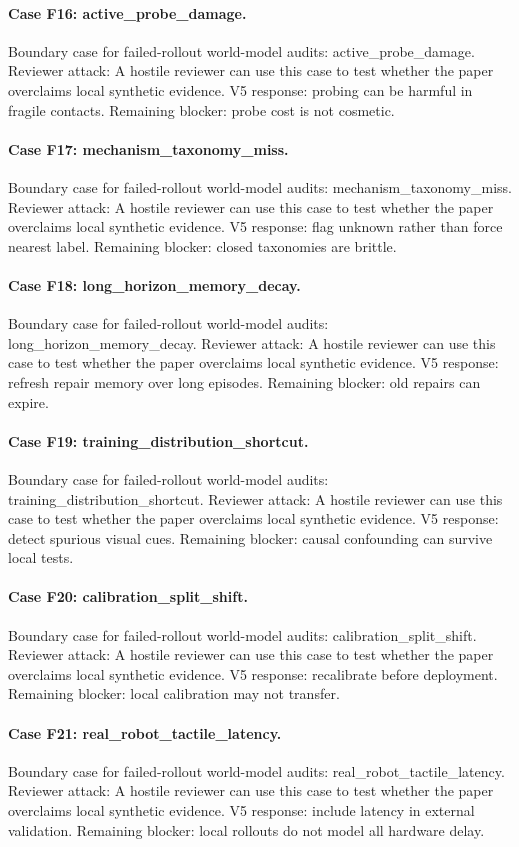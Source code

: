 \documentclass{article}
\begin{document}
\paragraph{Case F16: active\_probe\_damage.} Boundary case for failed-rollout world-model audits: active\_probe\_damage. Reviewer attack: A hostile reviewer can use this case to test whether the paper overclaims local synthetic evidence. V5 response: probing can be harmful in fragile contacts. Remaining blocker: probe cost is not cosmetic.
\paragraph{Case F17: mechanism\_taxonomy\_miss.} Boundary case for failed-rollout world-model audits: mechanism\_taxonomy\_miss. Reviewer attack: A hostile reviewer can use this case to test whether the paper overclaims local synthetic evidence. V5 response: flag unknown rather than force nearest label. Remaining blocker: closed taxonomies are brittle.
\paragraph{Case F18: long\_horizon\_memory\_decay.} Boundary case for failed-rollout world-model audits: long\_horizon\_memory\_decay. Reviewer attack: A hostile reviewer can use this case to test whether the paper overclaims local synthetic evidence. V5 response: refresh repair memory over long episodes. Remaining blocker: old repairs can expire.
\paragraph{Case F19: training\_distribution\_shortcut.} Boundary case for failed-rollout world-model audits: training\_distribution\_shortcut. Reviewer attack: A hostile reviewer can use this case to test whether the paper overclaims local synthetic evidence. V5 response: detect spurious visual cues. Remaining blocker: causal confounding can survive local tests.
\paragraph{Case F20: calibration\_split\_shift.} Boundary case for failed-rollout world-model audits: calibration\_split\_shift. Reviewer attack: A hostile reviewer can use this case to test whether the paper overclaims local synthetic evidence. V5 response: recalibrate before deployment. Remaining blocker: local calibration may not transfer.
\paragraph{Case F21: real\_robot\_tactile\_latency.} Boundary case for failed-rollout world-model audits: real\_robot\_tactile\_latency. Reviewer attack: A hostile reviewer can use this case to test whether the paper overclaims local synthetic evidence. V5 response: include latency in external validation. Remaining blocker: local rollouts do not model all hardware delay.
\end{document}
